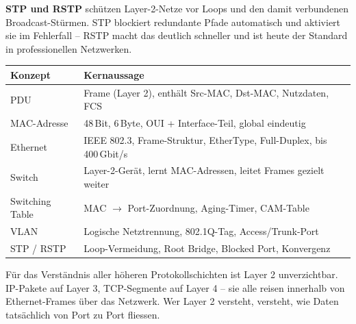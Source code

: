 \documentclass[11pt, oneside, numbers=nönddot]{scrbook}
\begin{document}
\textbf{STP und RSTP} schützen Layer-2-Netze vor Loops und den damit verbundenen Broadcast-Stürmen. STP blockiert redundante Pfade automatisch und aktiviert sie im Fehlerfall -- RSTP macht das deutlich schneller und ist heute der Standard in professionellen Netzwerken.

\begin{longtable}{|p{3.2cm}|p{10cm}|}
\hline
\textbf{Konzept} & \textbf{Kernaussage} \\
\hline
PDU & Frame (Layer 2), enthält Src-MAC, Dst-MAC, Nutzdaten, FCS \\
\hline
MAC-Adresse & 48\,Bit, 6\,Byte, OUI + Interface-Teil, global eindeutig \\
\hline
Ethernet & IEEE 802.3, Frame-Struktur, EtherType, Full-Duplex, bis 400\,Gbit/s \\
\hline
Switch & Layer-2-Gerät, lernt MAC-Adressen, leitet Frames gezielt weiter \\
\hline
Switching Table & MAC $\rightarrow$ Port-Zuordnung, Aging-Timer, CAM-Table \\
\hline
VLAN & Logische Netztrennung, 802.1Q-Tag, Access/Trunk-Port \\
\hline
STP / RSTP & Loop-Vermeidung, Root Bridge, Blocked Port, Konvergenz \\
\hline
\end{longtable}

Für das Verständnis aller höheren Protokollschichten ist Layer 2 unverzichtbar. IP-Pakete auf Layer 3, TCP-Segmente auf Layer 4 -- sie alle reisen innerhalb von Ethernet-Frames über das Netzwerk. Wer Layer 2 versteht, versteht, wie Daten tatsächlich von Port zu Port fliessen.
\end{document}
